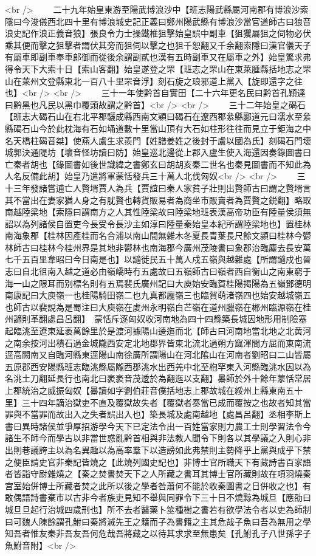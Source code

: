<br />
　　二十九年始皇東游至陽武博浪沙中【班志陽武縣屬河南郡有博浪沙索隱曰今浚儀西北四十里有博浪城史記正義曰鄭州陽武縣有博浪沙當官道師古曰狼音浪史記作浪正義音狼】張良令力士操鐵椎狙擊始皇誤中副車【狙玃屬狙之伺物必伏乘其便而擊之狙擊者謂伏其旁而狙伺以擊之也狙千恕翻又千余翻索隱曰漢官儀天子有屬車即副車奉車郎御而從後余謂副貳也漢有五時副車又在屬車之外】始皇驚求弗得令天下大索十日【索山客翻】始皇遂登之罘【班志之罘山在東萊腄縣括地志之罘山在萊州文登縣東北一百八十里罘音浮】刻石旋之琅邪道上黨入【旋即還字之往也】<br />
<br />
　　三十一年使黔首自實田【二十六年更名民曰黔首孔穎達曰黔黑也凡民以黑巾覆頭故謂之黔首】<br />
<br />
　　三十二年始皇之碣石【班志大碣石山在右北平郡驪成縣西南文穎曰碣石在遼西郡絫縣酈道元曰濡水至絫縣碣石山今於此枕海有石如埇道數十里當山頂有大石如柱形往往而見立于鉅海之中名天橋柱碣音桀】使燕人盧生求羨門【姓譜姜姓之後封于盧以國為氏】刻碣石門壞城郭決通隄坊【壞音怪坊讀曰防】始皇巡北邊從上郡入盧生使入海還因奏錄圖書曰亡秦者胡也【錄圖書如後世識緯之書鄭玄曰胡胡亥秦二世名也秦見圖書而不知此為人名反備此胡】始皇乃遣將軍蒙恬發兵三十萬人北伐匈奴<br />
<br />
　　三十三年發諸嘗逋亡人贅壻賈人為兵【賈誼曰秦人家貧子壯則出贅師古曰謂之贅壻言其不當出在妻家猶人身之有肬贅也轉貨販易者為商坐市販賣者為賈贅之鋭翻】略取南越陸梁地【索隱曰謂南方之人其性陸梁故曰陸梁地班表漢高帝功臣有陸量侯須無詔以為列諸侯自置吏今長受令長沙主如淳曰陸量秦始皇本紀所謂陸梁地也】置桂林南海象郡【桂林因產桂而名合浦以南山間無雜木冬夏長青葉長尺餘文潁曰桂林今鬰林師古曰桂林今桂州界是其地非鬰林也南海郡今廣州茂陵書曰象郡治臨塵去長安萬七千五百里韋昭曰今日南是也】以讁徙民五十萬人戍五嶺與越雜處【所謂讁戍也晉志曰自北徂南入越之道必由嶺嶠時冇五處故曰五嶺師古曰嶺者西自衡山之南東窮于海一山之限耳而别標名則有五焉裴氏廣州記曰大庾始安臨賀桂陽掲陽為五嶺鄧德明南康記曰大庾嶺一也桂陽騎田嶺二也九真都龐嶺三也臨賀萌渚嶺四也始安越城嶺五也師古以裴說為是蜀注曰大庾嶺在䖍州永明嶺白芒嶺在道州臘嶺在郴州臨源嶺在桂州讁則革翻處昌呂翻】　蒙恬斥逐匈奴收河南地為四十四縣築長城因地形用制險塞起臨洮至遼東延袤萬餘里於是渡河據陽山逶迤而北【師古曰河南地當北地之北黄河之南余按河出積石過金城隴西安定北地郡界皆東北流北過朔方窳渾間方屈而東南流逕高闕南又自臨河縣東逕陽山南徐廣所謂陽山在河北隂山在河南者劉昭曰二山皆屬五原郡西安陽縣班志臨洮縣屬隴西郡洮水出西羌中北至枹罕東入河縣臨洮水因以為名洮土刀翻延長行也南北曰袤袤音茂逶於為翻迤以支翻】㬥師於外十餘年蒙恬常居上郡統治之威振匈奴【㬥讀如字劉伯莊音僕括地志上郡故城在綏州上縣東南五十里】三十四年謫治獄吏不直及覆獄故失者【覆獄者奏當已成而覆按之也故者知其當罪與不當罪而故出入之失者誤出入也】築長城及處南越地【處昌呂翻】丞相李斯上書曰異時諸侯並爭厚招游學今天下已定法令出一百姓當家則力農工士則學習法令今諸生不師今而學古以非當世惑亂黔首相與非法教人聞令下則各以其學議之入則心非出則巷議誇主以為名異趣以為高率羣下以造謗如此弗禁則主勢降乎上黨與成乎下禁之便臣請史官非秦記皆燒之【此燒列國史記也】非博士官所職天下有藏詩書百家語者皆詣守尉雜燒之【秦之焚書焚天下之人所藏之書耳其博士官所藏則故在項羽燒秦宫室始併博士所藏者焚之此所以後之學者咎蕭何不能於收秦圖書之日併收之也】有敢偶語詩書棄市以古非今者族吏見知不舉與同罪令下三十日不燒黥為城旦【應劭曰城旦旦起行治城四歲刑也】所不去者醫藥卜筮種樹之書若有欲學法令者以吏為師制曰可魏人陳餘謂孔鮒曰秦將滅先王之籍而子為書籍之主其危哉子魚曰吾為無用之學知吾者惟友秦非吾友吾何危哉吾將藏之以待其求求至無患矣【孔鮒孔子八世孫字子魚鮒音附】<br />
